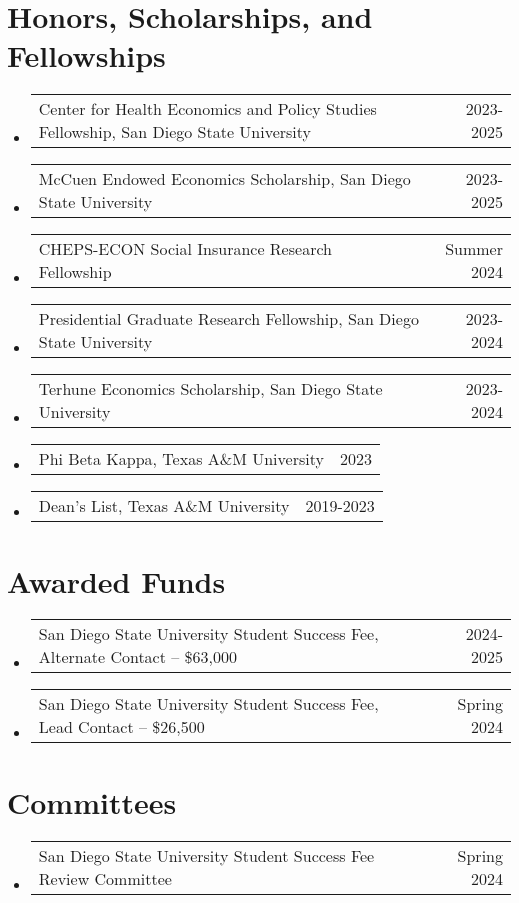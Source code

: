 \documentclass[letterpaper,11pt]{article}
\makeatletter
\newcommand{\resumeSubSubheading}[2]{
    \item
    \begin{tabular*}{0.97\textwidth}{l@{\extracolsep{\fill}}r}
      #1 & #2 \\
    \end{tabular*}\vspace{-7pt}
}
\newcommand{\resumeSubHeadingListStart}{\begin{itemize}[leftmargin=0.15in, label={}]}
\newcommand{\resumeSubHeadingListEnd}{\end{itemize}}
\makeatother
\begin{document}
\section{Honors, Scholarships, and Fellowships}
    \resumeSubHeadingListStart

      \resumeSubSubheading{Center for Health
      Economics and Policy Studies Fellowship, San Diego 
      State University}{2023-2025}

      \resumeSubSubheading{McCuen Endowed Economics Scholarship,
      San Diego State University}{2023-2025}

      \resumeSubSubheading{CHEPS-ECON Social Insurance 
      Research Fellowship}{Summer 2024}

      \resumeSubSubheading{Presidential Graduate Research 
      Fellowship, San Diego State University}{2023-2024}

      \resumeSubSubheading{Terhune Economics Scholarship,
      San Diego State University}{2023-2024}

      \resumeSubSubheading{Phi Beta Kappa, Texas A\&M University}{2023}

      \resumeSubSubheading{Dean's List, Texas A\&M University}{2019-2023}

    \resumeSubHeadingListEnd

\section{Awarded Funds}
    \resumeSubHeadingListStart
      
      \resumeSubSubheading{San Diego State University Student Success
      Fee, Alternate Contact -- \$63,000}{2024-2025}

      \resumeSubSubheading{San Diego State University Student Success
      Fee, Lead Contact -- \$26,500}{Spring 2024}

    \resumeSubHeadingListEnd

\section{Committees}
    \resumeSubHeadingListStart

      \resumeSubSubheading{San Diego State University Student Success
      Fee Review Committee}{Spring 2024}

    \resumeSubHeadingListEnd


\end{document}
